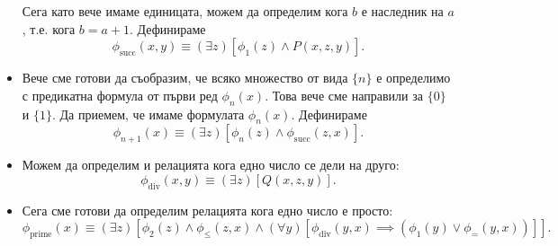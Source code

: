 \begin{example}
\begin{itemize}
    Сега като вече имаме единицата, можем да определим кога $b$ е наследник на $a$, т.е. кога $b = a + 1$.
    Дефинираме
    \[\phi_{\text{succ}}(x,y) \equiv (\exists z)[\phi_1(z) \land P(x,z,y)].\]
  \item
    Вече сме готови да съобразим, че всяко множество от вида $\{n\}$
    е определимо с предикатна формула от първи ред $\phi_n(x)$.
    Това вече сме направили за $\{0\}$ и $\{1\}$.
    Да приемем, че имаме формулата $\phi_n(x)$. Дефинираме
    \[\phi_{n+1}(x) \equiv (\exists z)[\phi_n(z) \land \phi_{\text{succ}}(z,x)].\]
  \item
    Можем да определим и релацията кога едно число се дели на друго:
    \[\phi_{\text{div}}(x,y) \equiv (\exists z)[Q(x,z,y)].\]
  \item
    Сега сме готови да определим релацията кога едно число е просто:
    \[\phi_{\text{prime}}(x) \equiv (\exists z)[\phi_2(z) \land \phi_{\leq}(z,x) \land (\forall y)[\phi_{\text{div}}(y,x) \implies (\phi_1(y) \lor
    \phi_{=}(y,x))]].\]
  \end{itemize}
\end{example}


